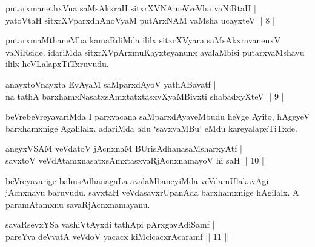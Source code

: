 
\begin{shl}
putarxmanethxVna saMsAkxraH sitxrXVNAmeVveVha vaNiRtaH | \\
yatoV\s taH sitxrXVparxdhAnoV\s yaM putArxNAM vaMsha ucayxteV \hfill||  8 ||  
\end{shl}

\begin{artha}
putarxmaMthaneMba kamaRdiMda ililx sitxrXVyara saMsAkxravanenxV
vaNiRside. idariMda sitxrXVpArxmuKayxteyanunx avalaMbisi 
putarxvaMshavu ililx heVLalapxTiTxruvudu.
\end{artha}


\begin{shl}
anayxtoV\s nayxta EvAyaM saMparxdAyoV yathA\s Bavatf | \\
na tathA barxhamxNasatxsAmxtatxtasxvXyaMBivxti shabadxyXteV \hfill||  9 ||  
\end{shl}

\begin{artha}
beVrebeVreyavariMda I parxvacana saMparxdAyaveMbudu heVge Ayito, 
hAgeyeV barxhamxnige Agalilalx. adariMda adu `savxyaMBu' eMdu 
kareyalapxTiTxde.
\end{artha}

\begin{shl}
aneyxVSAM veVdatoV jAcnxnaM BUrisAdhanasaMsharxyAtf | \\
savxtoV veVdAtamxnasatxsAmxtasxvaRjAcnxnamayoV hi saH \hfill||  10 ||  
\end{shl}

\begin{artha}
beVreyavarige bahusAdhanagaLa avalaMbaneyiMda veVdamUlakavAgi 
jAcnxnavu baruvudu. savxtaH veVdasavxrUpanAda barxhamxnige hAgilalx. 
A paramAtamxnu savaRjAcnxnamayanu.
\end{artha}

	
\begin{shl}
savaRseyxYSa vashiVtAyxdi tathA\s pi pArxgavAdiSamf | \\
pareYva deVvatA veVdoV yacacx kiMcicacxrAcaramf \hfill||  11 ||  
\end{shl}
	
